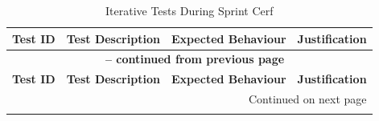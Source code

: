 \begin{longtable}{|p{}|p{}|p{}|p{}|}
	\caption{Iterative Tests During Sprint Cerf} \label{tab:sprint_cerf_tests_lt_rev} \\
	\hline
	\textbf{Test ID} & \textbf{Test Description} & \textbf{Expected Behaviour} & \textbf{Justification} \\
	\hline
	\endfirsthead
	\multicolumn{4}{c}{{\bfseries \tablename\ \thetable{} -- continued from previous page}} \\ \hline
	\textbf{Test ID} & \textbf{Test Description} & \textbf{Expected Behaviour} & \textbf{Justification} \\ \hline \endhead
	\hline \multicolumn{4}{r}{{Continued on next page}} \\ \endfoot \hline \endlastfoot
	

\end{longtable}
